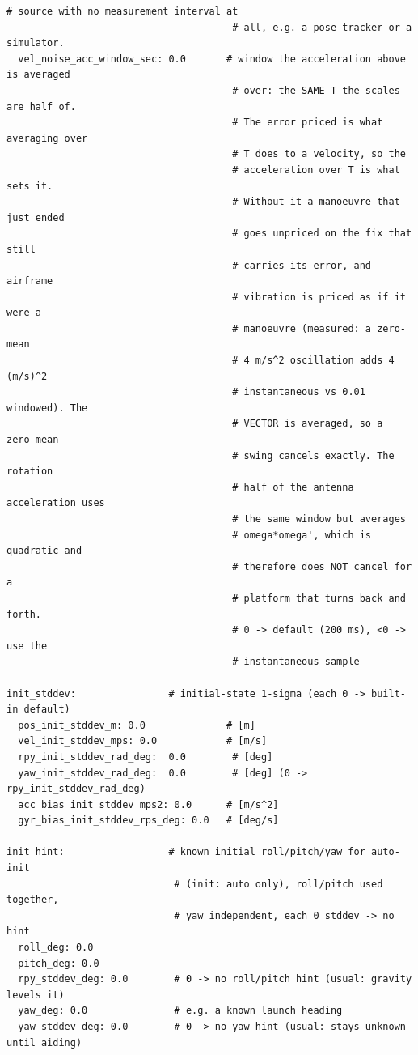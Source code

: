 \documentclass[11pt,a4paper]{article}
\begin{document}
\begin{lstlisting}[style=cfg]
                                       # source with no measurement interval at
                                       # all, e.g. a pose tracker or a simulator.
  vel_noise_acc_window_sec: 0.0       # window the acceleration above is averaged
                                       # over: the SAME T the scales are half of.
                                       # The error priced is what averaging over
                                       # T does to a velocity, so the
                                       # acceleration over T is what sets it.
                                       # Without it a manoeuvre that just ended
                                       # goes unpriced on the fix that still
                                       # carries its error, and airframe
                                       # vibration is priced as if it were a
                                       # manoeuvre (measured: a zero-mean
                                       # 4 m/s^2 oscillation adds 4 (m/s)^2
                                       # instantaneous vs 0.01 windowed). The
                                       # VECTOR is averaged, so a zero-mean
                                       # swing cancels exactly. The rotation
                                       # half of the antenna acceleration uses
                                       # the same window but averages
                                       # omega*omega', which is quadratic and
                                       # therefore does NOT cancel for a
                                       # platform that turns back and forth.
                                       # 0 -> default (200 ms), <0 -> use the
                                       # instantaneous sample

init_stddev:                # initial-state 1-sigma (each 0 -> built-in default)
  pos_init_stddev_m: 0.0              # [m]
  vel_init_stddev_mps: 0.0            # [m/s]
  rpy_init_stddev_rad_deg:  0.0        # [deg]
  yaw_init_stddev_rad_deg:  0.0        # [deg] (0 -> rpy_init_stddev_rad_deg)
  acc_bias_init_stddev_mps2: 0.0      # [m/s^2]
  gyr_bias_init_stddev_rps_deg: 0.0   # [deg/s]

init_hint:                  # known initial roll/pitch/yaw for auto-init
                             # (init: auto only), roll/pitch used together,
                             # yaw independent, each 0 stddev -> no hint
  roll_deg: 0.0
  pitch_deg: 0.0
  rpy_stddev_deg: 0.0        # 0 -> no roll/pitch hint (usual: gravity levels it)
  yaw_deg: 0.0               # e.g. a known launch heading
  yaw_stddev_deg: 0.0        # 0 -> no yaw hint (usual: stays unknown until aiding)


\end{lstlisting}
\end{document}
